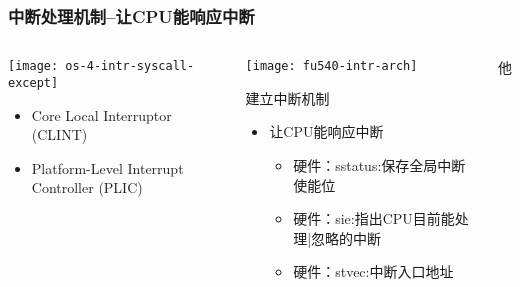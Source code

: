 \begin{frame}[plain,t]
	\frametitle{中断处理机制--让CPU能响应中断}
	\begin{columns}
		
		\begin{column}{0.45\textwidth}
			\centering
			\texttt{[image: os-4-intr-syscall-except]}
			\begin{itemize} \small
				\item Core Local	Interruptor (CLINT)
				\item Platform-Level Interrupt Controller (PLIC)
			\end{itemize}
			
		\end{column}
		
		\begin{column}{0.5\textwidth}
			
			\texttt{[image: fu540-intr-arch]}
			
			建立中断机制
			\begin{itemize}
				\item 让CPU能响应中断 \pause
					\begin{itemize} \small
						\item 硬件：sstatus:保存全局中断使能位	 \pause
						\item 硬件：sie:指出CPU目前能处理|忽略的中断 \pause
						\item 硬件：stvec:中断入口地址
					\end{itemize}		
			\end{itemize}		
			
		\end{column}他
		
	\end{columns}
	
\end{frame}


